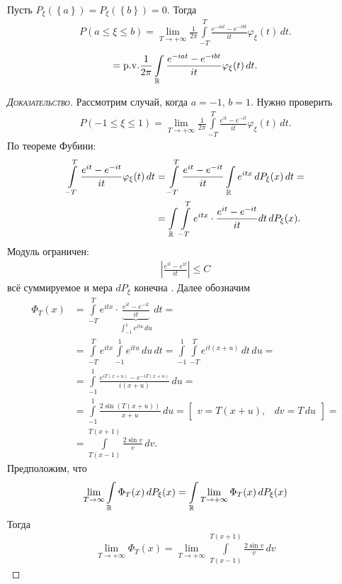 \documentclass[../main.tex]{subfiles}
\begin{document}
\begin{thm}
 Пусть $ P_\xi(\left\{ a \right\}) = P_\xi(\left\{ b \right\}) = 0 $. Тогда
 \begin{align*}
  P(a \leqslant \xi \leqslant b) = \lim_{T \to +\infty} \frac{1}{2\pi} \int\limits_{-T}^{T}  \frac{e^{-iat}-e^{-ibt}}{it} \varphi_\xi(t)\,dt.
 \end{align*}
 \begin{align*}
  = \mathrm{p.v.} \frac{1}{2\pi} \int\limits_{\mathbb{R}} \frac{e^{-iat}-e^{-ibt}}{it} \varphi_\xi(t)\,dt.
 \end{align*}
\end{thm}
\begin{proof}[\normalfont\textsc{Доказательство}]
 Рассмотрим случай, когда $ a = -1 $, $ b = 1 $. Нужно проверить
 \begin{align*}
  P(-1 \leqslant \xi \leqslant 1) = \lim_{T \to +\infty} \frac{1}{2\pi}\int\limits_{-T}^{T} \frac{e^{it}-e^{-it}}{it}\varphi_\xi(t)\,dt.
 \end{align*}
 По теореме Фубини:
 \begin{align*}
  \int\limits_{-T}^{T} \frac{e^{it}-e^{-it}}{it}\varphi_\xi(t)\,dt &= \int\limits_{-T}^{T} \frac{e^{it}-e^{-it}}{it} \int\limits_{\mathbb{R}} e^{itx}\,dP_\xi(x)\,dt = \\
  &= \int\limits_{\mathbb{R}} \int\limits_{-T}^{T} e^{itx} \cdot \frac{e^{it}-e^{-it}}{it}dt\,dP_\xi(x). 
 \end{align*} Модуль ограничен:
 \begin{align*}
  \left| \frac{e^{it}-e^{it}}{it} \right| \leqslant C
 \end{align*} всё суммируемое и мера $dP_\xi$ конечна . Далее обозначим
 \begin{align*}
  \Phi_T(x) &= \int\limits_{-T}^{T} e^{itx} \cdot \underbrace{\frac{e^{it}-e^{-it}}{it}}_{\int_{-1}^{1} e^{itu}\,du}\,dt = \\
  &= \int\limits_{-T}^{T} e^{itx}\int\limits_{-1}^{1} e^{itu}\,du\,dt = \int\limits_{-1}^{1} \int\limits_{-T}^{T} e^{it(x+u)}\,dt\,du = \\
  &= \int\limits_{-1}^{1} \frac{e^{iT(x+u)} - e^{-iT(x+u)}}{i(x+u)}\,du = \\
  &= \int\limits_{-1}^{1} \frac{2\sin(T(x+u))}{x+u}\,du = \begin{bmatrix}
   v = T(x+u), & dv = T\,du
  \end{bmatrix} = \\
  &= \int\limits_{T(x-1)}^{T(x+1)} \frac{2\sin v}{v}\,dv.
 \end{align*} Предположим, что
 \begin{align*}
  \lim_{T \to \infty} \int\limits_{\mathbb{R}} \Phi_T(x)\,dP_\xi(x) = \int\limits_{\mathbb{R}} \lim_{T \to +\infty}   \Phi_T(x)\,dP_\xi(x)
 \end{align*} Тогда
 \begin{align*}
  \lim_{T \to +\infty}  \Phi_T(x) = \lim_{T \to +\infty} \int\limits_{T(x-1)}^{T(x+1)}  \frac{2\sin v}{v}\,dv 
 \end{align*} 


\end{proof}
\end{document}
